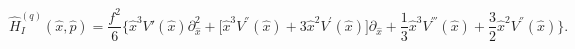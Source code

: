 \begin{equation}
\label{Eq:H-q-summed}
\hat H^{(q)}_I(\hat x,\hat p)
=\frac{f^2}{6}
\bigl\{ \hat x^3 V'(\hat x) \partial^2_{\hat x}
+ \bigl[\hat x^3 V^{''}(\hat x) +3 \hat x^2 V^{'}(\hat x)\bigr]
\partial_{\hat x}
+{\textstyle\frac{1}{3}}\hat x^3 V^{'''}(\hat x)
+{\textstyle\frac{3}{2}}\hat x^2 V^{''}(\hat x)\bigr\}.
\end{equation}

